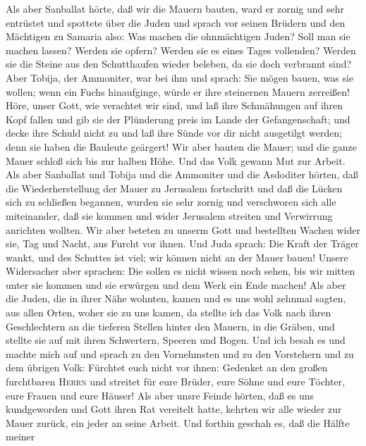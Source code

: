  Als aber Sanballat hörte, daß wir die Mauern bauten, ward
er zornig und sehr entrüstet und spottete über die Juden 
und sprach vor seinen Brüdern und den Mächtigen zu Samaria also: Was
machen die ohnmächtigen Juden? Soll man sie machen lassen? Werden sie
opfern? Werden sie es eines Tages vollenden? Werden sie die Steine aus
den Schutthaufen wieder beleben, da sie doch verbrannt sind?
 Aber Tobija, der Ammoniter, war bei ihm und sprach: Sie
mögen bauen, was sie wollen; wenn ein Fuchs hinaufginge, würde er ihre
steinernen Mauern zerreißen!  Höre, unser Gott, wie
verachtet wir sind, und laß ihre Schmähungen auf ihren Kopf fallen und
gib sie der Plünderung preis im Lande der Gefangenschaft; 
und decke ihre Schuld nicht zu und laß ihre Sünde vor dir nicht
ausgetilgt werden; denn sie haben die Bauleute geärgert! 
Wir aber bauten die Mauer; und die ganze Mauer schloß sich bis zur
halben Höhe. Und das Volk gewann Mut zur Arbeit.  Als aber
Sanballat und Tobija und die Ammoniter und die Asdoditer hörten, daß die
Wiederherstellung der Mauer zu Jerusalem fortschritt und daß die Lücken
sich zu schließen begannen,  wurden sie sehr zornig und
verschworen sich alle miteinander, daß sie kommen und wider Jerusalem
streiten und Verwirrung anrichten wollten.  Wir aber
beteten zu unserm Gott und bestellten Wachen wider sie, Tag und Nacht,
aus Furcht vor ihnen.  Und Juda sprach: Die Kraft der
Träger wankt, und des Schuttes ist viel; wir können nicht an der Mauer
bauen!  Unsere Widersacher aber sprachen: Die sollen es
nicht wissen noch sehen, bis wir mitten unter sie kommen und sie
erwürgen und dem Werk ein Ende machen!  Als aber die
Juden, die in ihrer Nähe wohnten, kamen und es uns wohl zehnmal sagten,
aus allen Orten, woher sie zu uns kamen,  da stellte ich
das Volk nach ihren Geschlechtern an die tieferen Stellen hinter den
Mauern, in die Gräben, und stellte sie auf mit ihren Schwertern, Speeren
und Bogen.  Und ich besah es und machte mich auf und
sprach zu den Vornehmsten und zu den Vorstehern und zu dem übrigen Volk:
Fürchtet euch nicht vor ihnen: Gedenket an den großen furchtbaren
\textsc{Herrn} und streitet für eure Brüder, eure Söhne und eure
Töchter, eure Frauen und eure Häuser!  Als aber unsre
Feinde hörten, daß es uns kundgeworden und Gott ihren Rat vereitelt
hatte, kehrten wir alle wieder zur Mauer zurück, ein jeder an seine
Arbeit.  Und forthin geschah es, daß die Hälfte meiner
